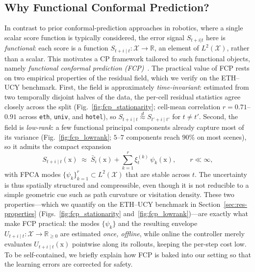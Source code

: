 \documentclass[lettersize,journal]{IEEEtran}
\begin{document}
\subsection{Why Functional Conformal Prediction?}\label{subsec:fcp-why}
In contrast to prior conformal-prediction approaches in robotics, where a single scalar score function is typically considered, the error signal $S_{t+i|t}$ here is \emph{functional}: each score is a function $S_{t+i\mid t}\colon\mathcal{X}\to\mathbb{R}$, an element of $L^2(\mathcal{X})$, rather than a scalar. This motivates a CP framework tailored to such functional objects, namely \emph{functional conformal prediction (FCP)}~\cite{lei2015conformal}. The practical value of FCP rests on two empirical properties of the residual field, which we verify on the ETH--UCY benchmark. First, the field is approximately \emph{time-invariant}: estimated from two temporally disjoint halves of the data, the per-cell residual statistics agree closely across the split (Fig.~\ref{fig:fcp_stationarity}; cell-mean correlation $r=0.71$--$0.91$ across \texttt{eth}, \texttt{univ}, and \texttt{hotel}), so $S_{t+i\mid t}\stackrel{d}{\approx}S_{t'+i\mid t'}$ for $t\neq t'$. Second, the field is \emph{low-rank}: a few functional principal components already capture most of its variance (Fig.~\ref{fig:fcp_lowrank}; $5$--$7$ components reach $90\%$ on most scenes), so it admits the compact expansion
\begin{equation}
S_{t+i\mid t}(\mathrm{x}) \;\approx\; \bar{S}_i(\mathrm{x}) + \sum_{k=1}^{r}\xi^{(k)}_{t}\,\psi_k(\mathrm{x}), \qquad r\ll\infty,
\label{eq:lowrank-score}
\end{equation}
with FPCA modes $\{\psi_k\}_{k=1}^{r}\subset L^2(\mathcal{X})$ that are stable across $t$. The uncertainty is thus spatially structured and compressible, even though it is not reducible to a simple geometric cue such as path curvature or visitation density. These two properties---which we quantify on the ETH--UCY benchmark in Section~\ref{sec:res-properties} (Figs.~\ref{fig:fcp_stationarity} and~\ref{fig:fcp_lowrank})---are exactly what make FCP practical: the modes $\{\psi_k\}$ and the resulting envelope $U_{t+i\mid t}\colon\mathcal{X}\to\mathbb{R}_{\ge 0}$ are estimated \emph{once, offline}, while online the controller merely evaluates $U_{t+i\mid t}(\mathrm{x})$ pointwise along its rollouts, keeping the per-step cost low. To be self-contained, we briefly explain how FCP is baked into our setting so that the learning errors are corrected for safety.
\end{document}
